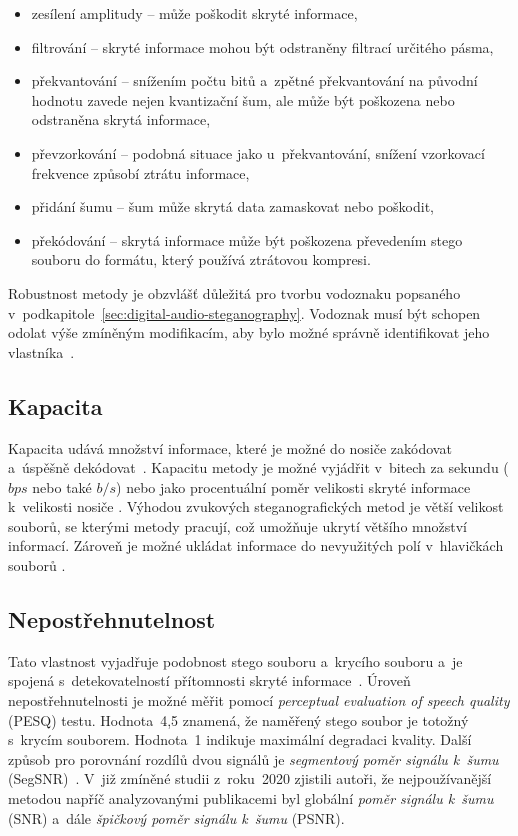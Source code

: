 \begin{itemize}
    \item zesílení amplitudy -- může poškodit skryté informace,
    \item filtrování -- skryté informace mohou být odstraněny filtrací určitého
        pásma,
    \item překvantování -- snížením počtu bitů a~zpětné překvantování na
        původní hodnotu zavede nejen kvantizační šum, ale může být poškozena
        nebo odstraněna skrytá informace,
    \item převzorkování -- podobná situace jako u~překvantování, snížení
        vzorkovací frekvence způsobí ztrátu informace,
    \item přidání šumu -- šum může skrytá data zamaskovat nebo poškodit,
    \item překódování -- skrytá informace může být poškozena převedením stego
        souboru do formátu, který používá ztrátovou kompresi.
\end{itemize}

Robustnost metody je obzvlášť důležitá pro tvorbu vodoznaku popsaného
v~podkapitole~\ref{sec:digital-audio-steganography}. Vodoznak musí být schopen
odolat výše zmíněným modifikacím, aby bylo možné správně identifikovat jeho
vlastníka~\cite{Swanson1998}.

\subsection*{Kapacita}
\label{sub:capacity}

Kapacita udává množství informace, které je možné do nosiče zakódovat a~úspěšně
dekódovat~\cite{Dutta2020}\cite{Djebbar2012}. Kapacitu metody je možné vyjádřit
v~bitech za sekundu ($bps$ nebo také $b/s$) nebo jako procentuální poměr
velikosti skryté informace k~velikosti nosiče
\cite{AlSabhany2020}\cite{Dutta2020}. Výhodou zvukových steganografických metod
je větší velikost souborů, se kterými metody pracují, což umožňuje ukrytí
většího množství informací. Zároveň je možné ukládat informace do nevyužitých
polí v~hlavičkách souborů \cite{Dutta2020}.

\subsection*{Nepostřehnutelnost}
\label{sub:imperceptibility}

Tato vlastnost vyjadřuje podobnost stego souboru a~krycího souboru a~je spojená
s~detekovatelností přítomnosti skryté informace~\cite{AlSabhany2020}. Úroveň
nepostřehnutelnosti je možné měřit pomocí \textit{perceptual evaluation of
speech quality} (PESQ) testu. Hodnota~4,5 znamená, že naměřený stego soubor je
totožný s~krycím souborem. Hodnota~1 indikuje maximální degradaci kvality.
Další způsob pro porovnání rozdílů dvou signálů je \textit{segmentový poměr
signálu k~šumu} (SegSNR)~\cite{Djebbar2012}. V~již zmíněné studii z~roku~2020
\cite{AlSabhany2020} zjistili autoři, že nejpoužívanější metodou napříč
analyzovanými publikacemi byl globální \textit{poměr signálu k~šumu} (SNR)
a~dále \textit{špičkový poměr signálu k~šumu} (PSNR).

